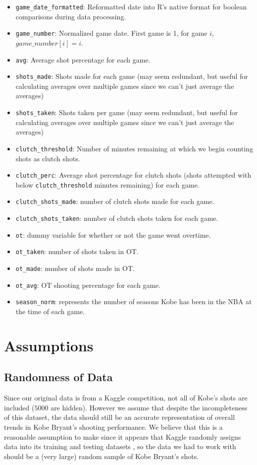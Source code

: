 \documentclass[paper=a4, fontsize=11pt]{scrartcl} %
\numberwithin{equation}{section} %
\numberwithin{figure}{section} %
\numberwithin{table}{section} %
\begin{document}
\begin{itemize}
	\item \texttt{game\_date\_formatted}: Reformatted date into R's native format for boolean comparisons during data processing. 
	\item \texttt{game\_number}: Normalized game date. First game is 1, for game $i$, $game\_number[i] = i$.
	\item \texttt{avg}: Average shot percentage for each game.
	\item \texttt{shots\_made}: Shots made for each game (may seem redundant, but useful for calculating averages over multiple games since we can't just average the averages)
	\item \texttt{shots\_taken}: Shots taken per game (may seem redundant, but useful for calculating averages over multiple games since we can't just average the averages)
	\item \texttt{clutch\_threshold}: Number of minutes remaining at which we begin counting shots as clutch shots.
	\item \texttt{clutch\_perc}: Average shot percentage for clutch shots (shots attempted with below \texttt{clutch\_threshold} minutes remaining) for each game.
	\item \texttt{clutch\_shots\_made}: number of clutch shots made for each game.
	\item \texttt{clutch\_shots\_taken}: number of clutch shots taken for each game. 
	\item \texttt{ot}: dummy variable for whether or not the game went overtime.
	\item \texttt{ot\_taken}: number of shots taken in OT.
	\item \texttt{ot\_made}: number of shots made in OT.
	\item \texttt{ot\_avg}: OT shooting percentage for each game.
	\item \texttt{season\_norm}: represents the number of seasons Kobe has been in the NBA at the time of each game.
	\end{itemize}
\section{Assumptions}
\subsection{Randomness of Data}
\hspace*{1cm}Since our original data is from a Kaggle competition, not all of Kobe's shots are included ($5000$ are hidden). However we assume that despite the incompleteness of this dataset, the data should still be an accurate representation of overall trends in Kobe Bryant's shooting performance. We believe that this is a reasonable assumption to make since it appears that Kaggle randomly assigns data into its training and testing datasets \cite{forumpost}, so the data we had to work with should be a (very large) random sample of Kobe Bryant's shots.
\end{document}
